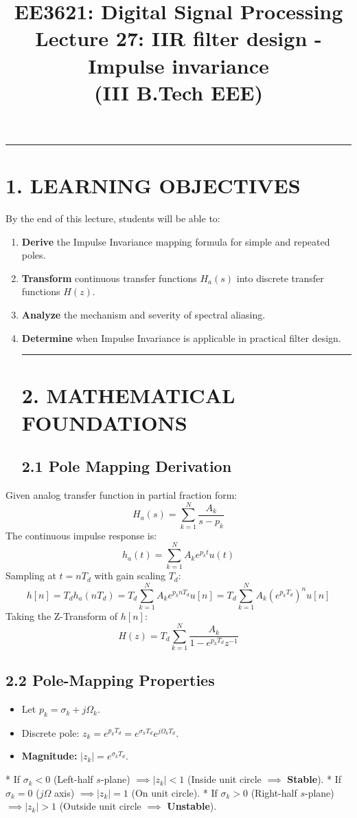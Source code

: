 \documentclass[11pt,a4paper]{article}
\begin{document}
\title{\textbf{EE3621: Digital Signal Processing} \\ \Large Lecture 27: IIR filter design - Impulse invariance \\ \large (III B.Tech EEE)}\maketitle

\noindent\rule{\textwidth}{0.5pt}
\section*{1. LEARNING OBJECTIVES}
By the end of this lecture, students will be able to:
\begin{enumerate}
\item \textbf{Derive} the Impulse Invariance mapping formula for simple and repeated poles.
\item \textbf{Transform} continuous transfer functions $H_a(s)$ into discrete transfer functions $H(z)$.
\item \textbf{Analyze} the mechanism and severity of spectral aliasing.
\item \textbf{Determine} when Impulse Invariance is applicable in practical filter design.

\noindent\rule{\textwidth}{0.5pt}
\section*{2. MATHEMATICAL FOUNDATIONS}

\subsection*{2.1 Pole Mapping Derivation}
\end{enumerate}
Given analog transfer function in partial fraction form:
$$ H_a(s) = \sum_{k=1}^{N} \frac{A_k}{s - p_k} $$
The continuous impulse response is:
$$ h_a(t) = \sum_{k=1}^{N} A_k e^{p_k t} u(t) $$
Sampling at $t = n T_d$ with gain scaling $T_d$:
$$ h[n] = T_d h_a(n T_d) = T_d \sum_{k=1}^{N} A_k e^{p_k n T_d} u[n] = T_d \sum_{k=1}^{N} A_k (e^{p_k T_d})^n u[n] $$
Taking the Z-Transform of $h[n]$:
$$ H(z) = T_d \sum_{k=1}^{N} \frac{A_k}{1 - e^{p_k T_d} z^{-1}} $$

\subsection*{2.2 Pole-Mapping Properties}
\begin{itemize}
\item Let $p_k = \sigma_k + j\Omega_k$.
\item Discrete pole: $z_k = e^{p_k T_d} = e^{\sigma_k T_d} e^{j\Omega_k T_d}$.
\item \textbf{Magnitude:} $|z_k| = e^{\sigma_k T_d}$.
\end{itemize}
  * If $\sigma_k < 0$ (Left-half $s$-plane) $\implies |z_k| < 1$ (Inside unit circle $\implies$ \textbf{Stable}).
  * If $\sigma_k = 0$ ($j\Omega$ axis) $\implies |z_k| = 1$ (On unit circle).
  * If $\sigma_k > 0$ (Right-half $s$-plane) $\implies |z_k| > 1$ (Outside unit circle $\implies$ \textbf{Unstable}).
\end{document}
